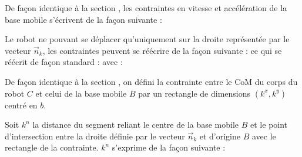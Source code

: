 				
					De façon identique à la section , les contraintes en vitesse et accélération de la base mobile s'écrivent de la façon suivante :	
					
					Le robot ne pouvant se déplacer qu'uniquement sur la droite représentée par le vecteur $\vec{n}_k$, les contraintes peuvent se réécrire de la façon suivante :
					ce qui se réécrit de façon standard :
					avec :
				
				
					
					De façon identique à la section , on défini la contrainte entre le CoM du corps du robot $C$ et celui de la base mobile $B$ par un rectangle de dimensions $(k^x, k^y)$ centré en $b$.
					
					Soit $k^n$ la distance du segment reliant le centre de la base mobile $B$ et le point d'intersection entre la droite définie par le vecteur $\vec{n}_k$ et d'origine $B$ avec le rectangle de la contrainte. $k^n$ s'exprime de la façon suivante  :
					
